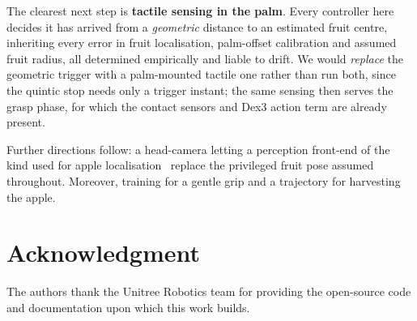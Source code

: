 \documentclass[conference,a4paper]{IEEEtran}
\begin{document}
The clearest next step is \textbf{tactile sensing in the palm}. Every
controller here decides it has arrived from a \emph{geometric} distance to an
estimated fruit centre, inheriting every error in fruit localisation,
palm-offset calibration and assumed fruit radius, all determined empirically
and liable to drift. We would \emph{replace} the geometric trigger with a
palm-mounted tactile one rather than run both, since the quintic stop needs
only a trigger instant; the same sensing then serves the grasp phase, for
which the contact sensors and Dex3 action term are already present.

Further directions follow: a head-camera letting a
perception front-end of the kind used for apple
localisation~\cite{selvaraj2024segmentation} replace the privileged fruit pose
assumed throughout. 
Moreover, training for a gentle grip and a trajectory for harvesting the apple.

\section*{Acknowledgment}

The authors thank the Unitree Robotics team for providing the open-source code and documentation upon which this work builds.



\end{document}
